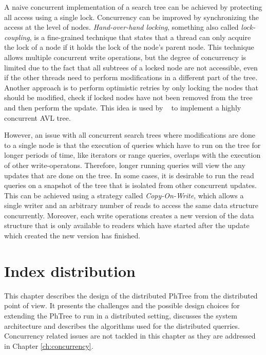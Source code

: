 \documentclass[11pt,a4paper]{globis-book}
\begin{document}
A naive concurrent implementation of a search tree can be achieved by protecting all access using a single lock. Concurrency can be improved by synchronizing the access at the level of nodes. \textit{Hand-over-hand locking}, something also called \textit{lock-coupling}, is a fine-grained technique that states that a thread can only acquire the lock of a node if it holds the lock of the node's parent node. This technique allows multiple concurrent write operations, but the degree of concurrency is limited due to the fact that all subtrees of a locked node are not accessible, even if the other threads need to perform modifications in a different part of the tree. Another approach is to perform optimistic retries by only locking the nodes that should be modified, check if locked nodes have not been removed from the tree and then perform the update. This idea is used by ~\cite{Bronson2010concurrent} to implement a highly concurrent AVL tree.

However, an issue with all concurrent search trees where modifications are done to a single node is that the execution of queries which have to run on the tree for longer periods of time, like iterators or range queries, overlaps with the execution of other write-operatons. Therefore, longer running queries will view the any updates that are done on the tree. In some cases, it is desirable to run the read queries on a snapshot of the tree that is isolated from other concurrent updates. This can be achieved using a strategy called \textit{Copy-On-Write}, which allows a single writer and an arbitrary number of reads to access the same data structure concurrently. Moreover, each write operations creates a new version of the data structure that is only available to readers which have started after the update which created the new version has finished. 

\chapter{Index distribution}
\label{ch:distindex}

This chapter describes the design of the distributed PhTree from the distributed point of view. It presents the challenges and the possible design choices for extending the PhTree to run in a distributed setting, discusses the system architecture and describes the algorithms used for the distributed querries. Concurrency related issues are not tackled in this chapter as they are addressed in Chapter \ref{ch:concurrency}.
\end{document}
